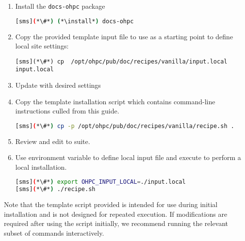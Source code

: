 \begin{enumerate}
\item Install the \texttt{docs-ohpc} package

\begin{lstlisting}[language=bash,keywords={}]
[sms](*\#*) (*\install*) docs-ohpc
\end{lstlisting}

\item Copy the provided template input file to use as a starting point to
  define local site settings:
\begin{lstlisting}
[sms](*\#*) cp  /opt/ohpc/pub/doc/recipes/vanilla/input.local input.local
\end{lstlisting}

\item Update  with desired settings

\item Copy the template installation script which contains command-line
  instructions culled from this guide.

\begin{lstlisting}[language=bash,keywords={}]
[sms](*\#*) cp -p /opt/ohpc/pub/doc/recipes/vanilla/recipe.sh .
\end{lstlisting}

\item Review and edit  to suite.

\item Use environment variable to define local input file and execute
   to perform a local installation.

\begin{lstlisting}[language=bash,keywords={}]
[sms](*\#*) export OHPC_INPUT_LOCAL=./input.local
[sms](*\#*) ./recipe.sh
\end{lstlisting}
\end{enumerate}

\vspace*{0.1cm}

\begin{center}
\begin{tcolorbox}[]
\small Note that the template script provided is intended for use during
initial installation and is not designed for repeated execution.  If
modifications are required after using the script initially, we recommend
running the relevant subset of commands interactively.
\end{tcolorbox}
\end{center}
